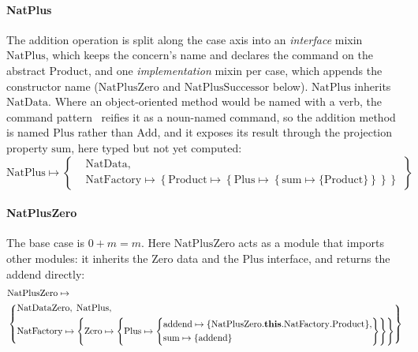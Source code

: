 \paragraph{NatPlus}
The addition operation is split along the case axis into an \emph{interface}
mixin $\mathrm{NatPlus}$, which keeps the concern's name and declares the command
on the abstract $\mathrm{Product}$, and one \emph{implementation} mixin per case,
which appends the constructor name ($\mathrm{NatPlusZero}$ and
$\mathrm{NatPlusSuccessor}$ below). $\mathrm{NatPlus}$ inherits
$\mathrm{NatData}$. Where an
object-oriented method would be named with a verb, the command
pattern~\cite{gamma1994-design-patterns} reifies it as a noun-named command, so
the addition method is named $\mathrm{Plus}$ rather than $\mathrm{Add}$, and it
exposes its result through the projection property $\mathrm{sum}$, here typed but
not yet computed:
\[
  \mathrm{NatPlus} \mapsto \left\{
    \begin{aligned}
      &\mathrm{NatData},\\
      &\mathrm{NatFactory} \mapsto \left\{\mathrm{Product} \mapsto \left\{\mathrm{Plus} \mapsto \left\{\mathrm{sum} \mapsto \{\mathrm{Product}\}\right\}\right\}\right\}
  \end{aligned}\right\}
\]

\paragraph{NatPlusZero}
The base case is $0 + m = m$. Here $\mathrm{NatPlusZero}$ acts as a module that
imports other modules: it inherits the $\mathrm{Zero}$ data and the $\mathrm{Plus}$
interface, and returns the addend directly:
\[
  \begin{aligned}
    &\mathrm{NatPlusZero} \mapsto \\
    &\left\{
    \begin{aligned}
      &\mathrm{NatDataZero},\; \mathrm{NatPlus},\\
      &\mathrm{NatFactory} \mapsto \left\{\mathrm{Zero} \mapsto \left\{\mathrm{Plus} \mapsto \left\{
          \begin{aligned}
            &\mathrm{addend} \mapsto \{\mathrm{NatPlusZero}.\mathbf{this}.\mathrm{NatFactory}.\mathrm{Product}\},\\
            &\mathrm{sum} \mapsto \{\mathrm{addend}\}
      \end{aligned}\right\}\right\}\right\}
  \end{aligned}\right\}
  \end{aligned}
\]


